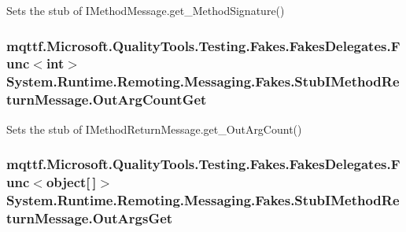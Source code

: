 Sets the stub of I\-Method\-Message.\-get\-\_\-\-Method\-Signature()

\hypertarget{class_system_1_1_runtime_1_1_remoting_1_1_messaging_1_1_fakes_1_1_stub_i_method_return_message_ac7749d4834f325468f8e992dbf32dd07}{
\subsubsection[{Out\-Arg\-Count\-Get}]{\setlength{\rightskip}{0pt plus 5cm}mqttf.\-Microsoft.\-Quality\-Tools.\-Testing.\-Fakes.\-Fakes\-Delegates.\-Func$<$int$>$ System.\-Runtime.\-Remoting.\-Messaging.\-Fakes.\-Stub\-I\-Method\-Return\-Message.\-Out\-Arg\-Count\-Get}}\label{class_system_1_1_runtime_1_1_remoting_1_1_messaging_1_1_fakes_1_1_stub_i_method_return_message_ac7749d4834f325468f8e992dbf32dd07}


Sets the stub of I\-Method\-Return\-Message.\-get\-\_\-\-Out\-Arg\-Count()

\hypertarget{class_system_1_1_runtime_1_1_remoting_1_1_messaging_1_1_fakes_1_1_stub_i_method_return_message_a4f6e0b943f0506feb332cbef0c77b070}{
\subsubsection[{Out\-Args\-Get}]{\setlength{\rightskip}{0pt plus 5cm}mqttf.\-Microsoft.\-Quality\-Tools.\-Testing.\-Fakes.\-Fakes\-Delegates.\-Func$<$object\mbox{[}$\,$\mbox{]}$>$ System.\-Runtime.\-Remoting.\-Messaging.\-Fakes.\-Stub\-I\-Method\-Return\-Message.\-Out\-Args\-Get}}\label{class_system_1_1_runtime_1_1_remoting_1_1_messaging_1_1_fakes_1_1_stub_i_method_return_message_a4f6e0b943f0506feb332cbef0c77b070}


